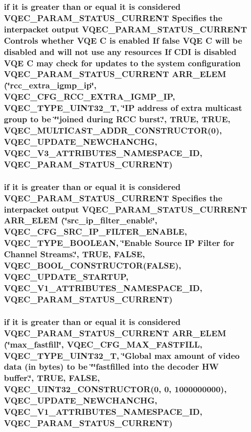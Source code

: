 \subsubsection{\setlength{\rightskip}{0pt plus 5cm}if it is greater than or equal it is considered VQEC\_\-PARAM\_\-STATUS\_\-CURRENT Specifies the interpacket output VQEC\_\-PARAM\_\-STATUS\_\-CURRENT Controls whether VQE \bf{C} is enabled If false VQE \bf{C} will be disabled and will not use any resources If CDI is disabled VQE \bf{C} may check for updates \bf{to} the system configuration VQEC\_\-PARAM\_\-STATUS\_\-CURRENT ARR\_\-ELEM (\char`\"{}rcc\_\-extra\_\-igmp\_\-ip\char`\"{}, VQEC\_\-CFG\_\-RCC\_\-EXTRA\_\-IGMP\_\-IP, \bf{VQEC\_\-TYPE\_\-UINT32\_\-T}, \char`\"{}IP address of extra multicast group \bf{to} be \char`\"{}\char`\"{}joined during \bf{RCC} burst.\char`\"{}, \bf{TRUE}, \bf{TRUE}, VQEC\_\-MULTICAST\_\-ADDR\_\-CONSTRUCTOR(0), \bf{VQEC\_\-UPDATE\_\-NEWCHANCHG}, \bf{VQEC\_\-V3\_\-ATTRIBUTES\_\-NAMESPACE\_\-ID}, VQEC\_\-PARAM\_\-STATUS\_\-CURRENT)}\label{vqec__cfg__settings_8h_6e77ffd6970ea9199f5027c9d54320b4}


\subsubsection{\setlength{\rightskip}{0pt plus 5cm}if it is greater than or equal it is considered VQEC\_\-PARAM\_\-STATUS\_\-CURRENT Specifies the interpacket output VQEC\_\-PARAM\_\-STATUS\_\-CURRENT ARR\_\-ELEM (\char`\"{}src\_\-ip\_\-filter\_\-enable\char`\"{}, VQEC\_\-CFG\_\-SRC\_\-IP\_\-FILTER\_\-ENABLE, \bf{VQEC\_\-TYPE\_\-BOOLEAN}, \char`\"{}Enable Source IP Filter for Channel Streams.\char`\"{}, \bf{TRUE}, \bf{FALSE}, VQEC\_\-BOOL\_\-CONSTRUCTOR(\bf{FALSE}), \bf{VQEC\_\-UPDATE\_\-STARTUP}, \bf{VQEC\_\-V1\_\-ATTRIBUTES\_\-NAMESPACE\_\-ID}, VQEC\_\-PARAM\_\-STATUS\_\-CURRENT)}\label{vqec__cfg__settings_8h_185ec760b39b20535e423495cc829241}


\subsubsection{\setlength{\rightskip}{0pt plus 5cm}if it is greater than or equal it is considered VQEC\_\-PARAM\_\-STATUS\_\-CURRENT ARR\_\-ELEM (\char`\"{}max\_\-fastfill\char`\"{}, VQEC\_\-CFG\_\-MAX\_\-FASTFILL, \bf{VQEC\_\-TYPE\_\-UINT32\_\-T}, \char`\"{}Global max amount of video data (in bytes) \bf{to} be \char`\"{}\char`\"{}fastfilled into the decoder HW buffer.\char`\"{}, \bf{TRUE}, \bf{FALSE}, VQEC\_\-UINT32\_\-CONSTRUCTOR(0, 0, 1000000000), \bf{VQEC\_\-UPDATE\_\-NEWCHANCHG}, \bf{VQEC\_\-V1\_\-ATTRIBUTES\_\-NAMESPACE\_\-ID}, VQEC\_\-PARAM\_\-STATUS\_\-CURRENT)}\label{vqec__cfg__settings_8h_897e14ca44de0143df98ae4fe8e2334a}


